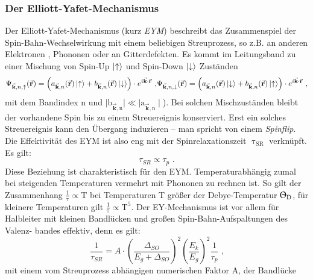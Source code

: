 \subsubsection{Der Elliott-Yafet-Mechanismus} Der Elliott-Yafet-Mechanismus
(kurz \textit{EYM})\cite{Elliott.1954,Yafet.1963} beschreibt das Zusammenspiel
der Spin-Bahn-Wechselwirkung mit einem beliebigen Streuprozess, so z.B. an
anderen Elektronen \cite{Boguslawski.1980}, Phononen oder an Gitterdefekten. Es
kommt im Leitungsband zu einer Mischung von Spin-Up $\ket{\uparrow}$ und
Spin-Down $\ket{\downarrow}$ Zuständen \begin{equation}
\Psi_{\vec{\textbf{k}},n,\uparrow}(\vec{\textbf{r}})=\left(
a_{\vec{\textbf{k}},n}(\vec{\textbf{r}})\ket{\uparrow} +
b_{\vec{\textbf{k}},n}(\vec{\textbf{r}})\ket{\downarrow}\right)\cdot e^{i
\vec{\textbf{k}}\cdot \vec{\textbf{r}}} \text{ ,}\\
\Psi_{\vec{\textbf{k}},n,\downarrow}(\vec{\textbf{r}})=\left(
a_{\vec{\textbf{k}},n}(\vec{\textbf{r}})\ket{\downarrow} +
b_{\vec{\textbf{k}},n}(\vec{\textbf{r}})\ket{\uparrow}\right)\cdot e^{i
\vec{\textbf{k}}\cdot \vec{\textbf{r}}} \text{ ,} \end{equation} mit dem
Bandindex n und $\mid\text{b}_{\vec{\textbf{k}},\text{n}}\mid \ll
\mid\text{a}_{\vec{\textbf{k}},\text{n}}\mid$). Bei solchen Mischzuständen
bleibt der vorhandene Spin bis zu einem Streuereignis konserviert. Erst ein
solches Streuereignis kann den Übergang induzieren – man spricht von einem
\textit{Spinflip}. Die Effektivität des EYM ist also eng mit der
Spinrelaxationszeit $\uptau_\text{SR}$ verknüpft. Es gilt: \begin{equation}
\tau_{SR} \propto \tau_{p} \text{ .} \end{equation} Diese Beziehung ist
charakteristisch für den EYM. %
Temperaturabhängig zumal bei steigenden Temperaturen vermehrt mit Phononen zu
rechnen ist. So gilt der Zusammenhang $\frac{1}{\uptau} \propto \text{T}$ bei
Temperaturen T größer der Debye-Temperatur $\Uptheta_\text{D}$, für kleinere
Temperaturen gilt $\frac{1}{\uptau} \propto \text{T}^\text{5}$. Der
EY-Mechanismus ist vor \mbox{allem} für Halbleiter mit kleinen Bandlücken und
großen Spin-Bahn-Aufspaltungen des Valenz- bandes effektiv, denn es gilt:
\begin{equation} \frac{1}{\tau_{SR}}=A \cdot
\left(\frac{\Delta_{SO}}{E_g+\Delta_{SO}}\right)^2
\left(\frac{E_k}{E_g}\right)^2  \frac{1}{\tau_p} \text{ ,} \end{equation} mit
einem vom Streuprozess abhängigen numerischen Faktor A, der Bandlücke
